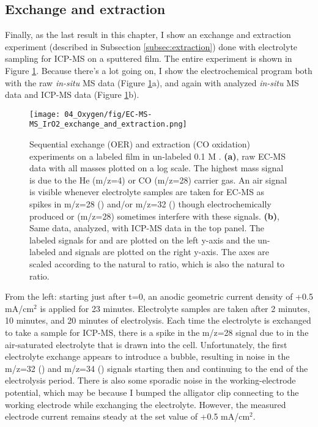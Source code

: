 \subsection{Exchange and extraction}

Finally, as the last result in this chapter, I show an exchange and extraction experiment (described in Subsection \ref{subsec:extraction}) done with electrolyte sampling for ICP-MS on a sputtered  film. The entire experiment is shown in Figure \ref{fig:EC-MS-MS_extraction}. Because there's a lot going on, I show the electrochemical program both with the raw \textit{in-situ} MS data (Figure \ref{fig:EC-MS-MS_extraction}a), and again with analyzed \textit{in-situ} MS data and ICP-MS data (Figure \ref{fig:EC-MS-MS_extraction}b). 

\begin{figure}[b!]
	\texttt{[image: 04\_Oxygen/fig/EC-MS-MS\_IrO2\_exchange\_and\_extraction.png]}
	\caption{Sequential exchange (OER) and extraction (CO oxidation) experiments on a labeled  film in un-labeled 0.1 M . \textbf{(a)}, raw EC-MS data with all masses plotted on a log scale. The highest mass signal is due to the He (m/z=4) or CO (m/z=28) carrier gas. An air signal is visible whenever electrolyte samples are taken for EC-MS as spikes in m/z=28 () and/or m/z=32 () though electrochemically produced  or  (m/z=28) sometimes interfere with these signals. \textbf{(b)}, Same data, analyzed, with ICP-MS data in the top panel. The labeled signals for  and  are plotted on the left y-axis and the un-labeled  and  signals are plotted on the right y-axis. The axes are scaled according to the natural  to  ratio, which is also the natural  to  ratio.
	}
	\label{fig:EC-MS-MS_extraction}
\end{figure}

From the left: starting just after t=0, an anodic geometric current density of +0.5 mA/cm$^2$ is applied for 23 minutes. Electrolyte samples are taken after 2 minutes, 10 minutes, and 20 minutes of electrolysis. Each time the electrolyte is exchanged to take a sample for ICP-MS, there is a spike in the m/z=28 signal due to  in the air-saturated electrolyte that is drawn into the cell. Unfortunately, the first electrolyte exchange appears to introduce a bubble, resulting in noise in the m/z=32 () and m/z=34 () signals starting then and continuing to the end of the electrolysis period. There is also some sporadic noise in the working-electrode potential, which may be because I bumped the alligator clip connecting to the working electrode while exchanging the electrolyte. However, the measured electrode current remains steady at the set value of +0.5 mA/cm$^2$.


